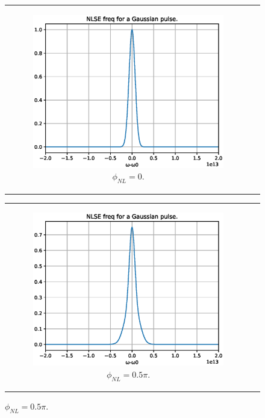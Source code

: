 \begin{figure}[label={fig:spmssfm}, caption={Shape of the spectra for Gaussian pulses by maximum phase shift ($\phi_{NL}$).}]
\begin{tabular}[c]{cc}
\begin{subfigure}[b]{.53\textwidth}
            \includegraphics[width=1\linewidth]{figures/chap3/ssfm_spm/0pi.eps}
            \caption{$\phi_{NL}= 0$.}
            \label{fig:spm0pi}
        \end{subfigure}
        \end{tabular}
        \begin{tabular}[c]{cc}
        \begin{subfigure}[b]{.53\textwidth}
		    \centering	
            \includegraphics[width=1\linewidth]{figures/chap3/ssfm_spm/0_5pi.eps}
            \caption{$\phi_{NL}= 0.5\pi$.}
            \label{fig:spm05pi}
        \end{subfigure}

\end{tabular}
\end{figure}
